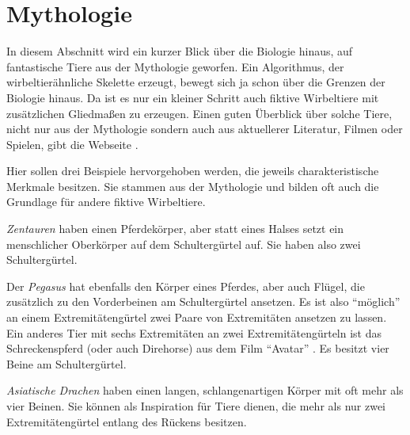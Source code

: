 \newpage
\section{Mythologie}
\label{biology_mythology}

In diesem Abschnitt wird ein kurzer Blick über die Biologie hinaus, auf fantastische Tiere aus der Mythologie geworfen. 
Ein Algorithmus, der wirbeltierähnliche Skelette erzeugt, bewegt sich ja schon über die Grenzen der Biologie hinaus. Da ist es nur ein kleiner Schritt auch fiktive Wirbeltiere mit zusätzlichen Gliedmaßen zu erzeugen.
Einen guten Überblick über solche Tiere, nicht nur aus der Mythologie sondern auch aus aktuellerer Literatur, Filmen oder Spielen, gibt die Webseite \cite{vertebrateExtraLimbs}.

Hier sollen drei Beispiele hervorgehoben werden, die jeweils charakteristische Merkmale besitzen. Sie stammen aus der Mythologie und bilden oft auch die Grundlage für andere fiktive Wirbeltiere.

\emph{Zentauren} haben einen Pferdekörper, aber statt eines Halses setzt ein menschlicher Oberkörper auf dem Schultergürtel auf. Sie haben also zwei Schultergürtel. 

Der \emph{Pegasus} hat ebenfalls den Körper eines Pferdes, aber auch Flügel, die zusätzlich zu den Vorderbeinen am Schultergürtel ansetzen. Es ist also "`möglich"' an einem Extremitätengürtel zwei Paare von Extremitäten ansetzen zu lassen. Ein anderes Tier mit sechs Extremitäten an zwei Extremitätengürteln ist das Schreckenspferd (oder auch Direhorse) aus dem Film "`Avatar"' \cite{direhorse}. Es besitzt vier Beine am Schultergürtel.

\emph{Asiatische Drachen} haben einen langen, schlangenartigen Körper mit oft mehr als vier Beinen. Sie können als Inspiration für Tiere dienen, die mehr als nur zwei Extremitätengürtel entlang des Rückens besitzen.

